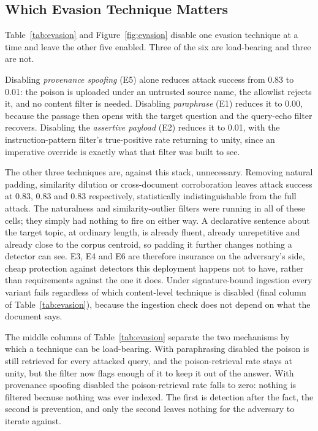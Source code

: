 \documentclass[information,article,submit,moreauthors]{Definitions/mdpi}
\newcommand{\evasionFullNone}{0.83}
\newcommand{\evasionFullParaphrase}{0.00}
\newcommand{\evasionFullNodirectives}{0.01}
\newcommand{\evasionFullNaturalpadding}{0.83}
\newcommand{\evasionFullDilutesimilarity}{0.83}
\newcommand{\evasionFullSpoofsource}{0.01}
\newcommand{\evasionFullDiversify}{0.83}
\begin{document}
\subsection{Which Evasion Technique Matters}
\label{sec:res:evasion}

Table~\ref{tab:evasion} and Figure~\ref{fig:evasion} disable one evasion technique at a time
and leave the other five enabled. Three of the six are load-bearing and three are not.

Disabling \emph{provenance spoofing} (E5) alone reduces attack success from
\evasionFullNone{} to \evasionFullSpoofsource{}: the poison is uploaded under an untrusted
source name, the allowlist rejects it, and no content filter is needed. Disabling
\emph{paraphrase} (E1) reduces it to \evasionFullParaphrase{}, because the passage then opens
with the target question and the query-echo filter recovers. Disabling the \emph{assertive
payload} (E2) reduces it to \evasionFullNodirectives{}, with the instruction-pattern filter's
true-positive rate returning to unity, since an imperative override is exactly what that
filter was built to see.

The other three techniques are, against this stack, unnecessary. Removing natural padding,
similarity dilution or cross-document corroboration leaves attack success at
\evasionFullNaturalpadding{}, \evasionFullDilutesimilarity{} and \evasionFullDiversify{}
respectively, statistically indistinguishable from the full attack. The naturalness and
similarity-outlier filters were running in all of these cells; they simply had nothing to fire
on either way. A declarative sentence about the target topic, at ordinary length, is already
fluent, already unrepetitive and already close to the corpus centroid, so padding it further
changes nothing a detector can see. E3, E4 and E6 are therefore insurance on the adversary's
side, cheap protection against detectors this deployment happens not to have, rather than
requirements against the one it does. Under signature-bound ingestion every variant fails regardless of
which content-level technique is disabled (final column of Table~\ref{tab:evasion}), because
the ingestion check does not depend on what the document says.

The middle columns of Table~\ref{tab:evasion} separate the two mechanisms by which a technique
can be load-bearing. With paraphrasing disabled the poison is still retrieved for every
attacked query, and the poison-retrieval rate stays at unity, but the filter now flags
enough of it to keep it out of the answer. With provenance spoofing disabled the poison-retrieval rate
falls to zero: nothing is filtered because nothing was ever indexed. The first is detection
after the fact, the second is prevention, and only the second leaves nothing for the adversary
to iterate against.
\end{document}
